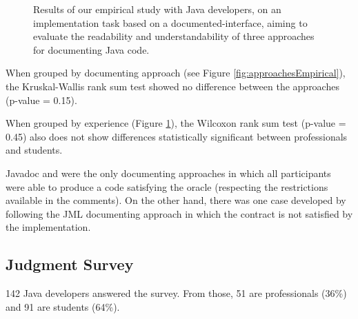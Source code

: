 \begin{figure}
\begin{subfigure}{.3\textwidth}
\caption{}
\label{fig:experienceEmpirical}
\end{subfigure}
\caption{Results of our empirical study with Java developers, on an implementation task based on a
documented-interface, aiming to evaluate the readability and understandability of three approaches
for documenting Java code.}
\label{fig:empiricalResults}
\end{figure}



When grouped by documenting approach (see Figure \ref{fig:approachesEmpirical}),
the Kruskal-Wallis rank sum test showed no difference between the approaches
(p-value = 0.15).


When grouped by experience (Figure \ref{fig:experienceEmpirical}), the Wilcoxon
rank sum test (p-value = 0.45) also does not show differences statistically
significant between professionals and students. 

Javadoc and \contractjdoc{} were the only documenting approaches in
which all participants were able to produce a code satisfying the oracle
(respecting the restrictions available in the comments). On the other hand,
there was one case developed by following the JML documenting approach in which
the contract is not satisfied by the implementation.





\subsection{Judgment Survey}
\label{sec:surveyResults}

142 Java developers answered the survey.
From those, 
51 are professionals (36\%) and 91 are students
(64\%).

